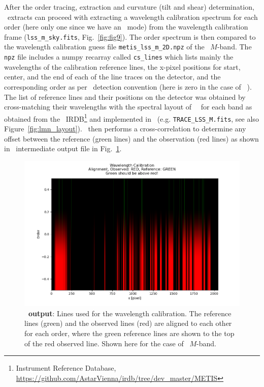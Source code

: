 After the order tracing, extraction and curvature (tilt and shear) determination, \pyred~extracts can proceed with extracting a wavelength calibration spectrum for each order (here only one since we have an \lss~mode) from the wavelength calibration frame (\texttt{lss\_m\_sky.fits}, Fig.~\ref{fig:fig9}). The order spectrum is then compared to the wavelength calibration guess file \texttt{metis\_lss\_m\_2D.npz} of the \lss~$M$-band.  The \texttt{npz} file includes a numpy recarray called \texttt{cs\_lines} which lists mainly the wavelengths of the calibration reference lines, the x-pixel positions for start, center, and the end of each of the line traces on the detector, and the corresponding order as per \pyred~detection convention (here is zero in the case of \met~\lss). The list of reference lines and their positions on the detector was obtained by cross-matching their wavelengths  with the spectral layout of \met~\lss~for each band as obtained from the \met~IRDB\footnote{Instrument Reference Database, \url{https://github.com/AstarVienna/irdb/tree/dev_master/METIS}} and implemented in \scope~(e.g. \texttt{TRACE\_LSS\_M.fits}, see also Figure~\ref{fig:lmn_layout}). \pyred~then performs a cross-correlation to determine any offset between the reference (green lines) and the observation (red lines) as shown in \pyred~intermediate output file in Fig.~\ref{fig:fig13_lines}.
\begin{figure}[!ht]
  \centering
  \includegraphics[width=\textwidth]{figures/LSS_CrtAlg_files/Figure_13.png}
  \caption[Pyreduce  wavelength reference lines]{\textbf{\pyred~output}: Lines used for the wavelength calibration. The reference lines (green) and the observed lines (red) are aligned to each other for each order, where the green reference lines are shown to the top of the red observed line.  Shown here for the case of \lss~$M$-band.}
  \label{fig:fig13_lines}
\end{figure}

